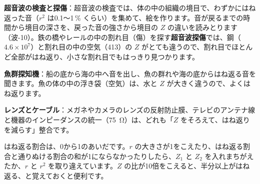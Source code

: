 \begin{phkougaku}
\textbf{超音波の検査と探傷}：超音波の検査では、体の中の組織の境目で、わずかにはね返った音（$r^2$ は0.1〜1\,\% くらい）を集めて、絵を作ります。音が戻るまでの時間から境目の深さを、戻った音の強さから境目の $Z$ の違いを読みとります（波-10）。鉄の橋やレールの中の割れ目（傷）を探す\textbf{超音波探傷}では、鋼（$4.6\times10^7$）と割れ目の中の空気（413）の $Z$ がとても違うので、割れ目でほとんど全部がはね返り、小さな割れ目でもはっきり見つかります。

\textbf{魚群探知機}：船の底から海の中へ音を出し、魚の群れや海の底からはね返る音を聞きます。魚の体の中の浮き袋（空気）は、水と $Z$ が大きく違うので、よくはね返ります。

\textbf{レンズとケーブル}：メガネやカメラのレンズの反射防止膜、テレビのアンテナ線と機器のインピーダンスの統一（\qty{75}{\ohm}）は、どれも「$Z$ をそろえて、はね返りを減らす」整合です。

\begin{phketa}[インピーダンスと反射の数の目安]
はね返る割合は、0から1のあいだです。$r$ の大きさが1をこえたり、はね返る割合と通りぬける割合の和が1にならなかったりしたら、$Z_1$ と $Z_2$ を入れまちがえたか、$r$ と $r^2$ を取り違えています。$Z$ の比が10倍をこえると、半分以上がはね返る、と覚えておくと便利です。
\end{phketa}
\end{phkougaku}

